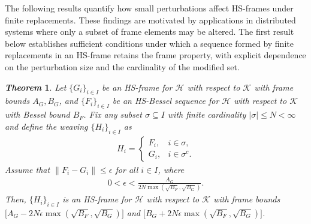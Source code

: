 \documentclass[reqno]{amsart}
\theoremstyle{plain}
\newtheorem{thm}{\it Theorem}[section]
\theoremstyle{remark}
\numberwithin{equation}{section}
\begin{document}
The following results quantify how small perturbations affect HS-frames under finite replacements. These findings are motivated by applications in distributed systems where only a subset of frame elements may be altered. The first result below establishes sufficient conditions under which a sequence formed by finite replacements in an HS-frame retains the frame property, with explicit dependence on the perturbation size and the cardinality of the modified set.
\begin{thm}\label{thm1}
Let  $\{G_i\}_{i \in I}$ be an HS-frame for $\mathcal{H}$ with respect to $\mathcal{K}$ with frame bounds $A_G, B_G$, and $\{F_i\}_{i \in I}$ be an HS-Bessel sequence for
$\mathcal{H}$ with respect to $\mathcal{K}$ with Bessel bound $B_F$. Fix any subset $\sigma \subseteq I$ with finite cardinality $|\sigma| \leq N < \infty$ and define the weaving  $\{H_i\}_{i \in I}$ as
\begin{align*}
H_i = \begin{cases}
F_i, & i \in \sigma, \\
G_i, & i \in \sigma^c.
\end{cases}
\end{align*}
Assume that  $\|F_i - G_i\| \leq \epsilon$ for all $i \in I$, where
\begin{align*}
0 <\epsilon < \frac{A_G}{2 N\max(\sqrt{B_F}, \sqrt{B_G})}.
\end{align*}
Then, $\{H_i\}_{i \in I}$ is an HS-frame for $\mathcal{H}$ with respect to $\mathcal{K}$ with frame bounds $\big[A_G - 2 N \epsilon \max(\sqrt{B_F}, \sqrt{B_G}) \big]$ and $\big[B_G + 2 N \epsilon \max(\sqrt{B_F}, \sqrt{B_G}) \big]$.
\end{thm}
\end{document}
